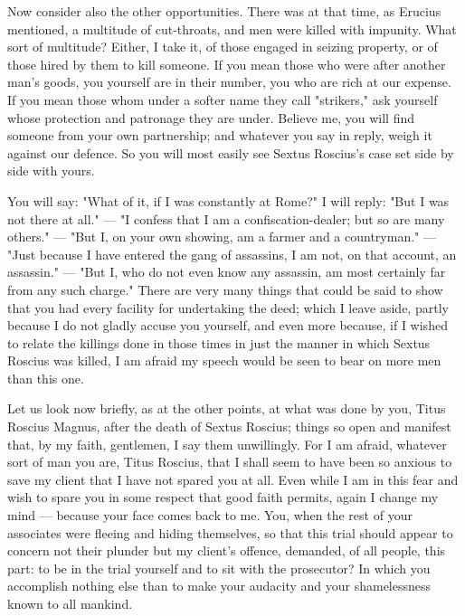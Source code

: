  Now consider also the other opportunities. There was at that time, as Erucius mentioned, a multitude of cut-throats, and men were killed with impunity. What sort of multitude? Either, I take it, of those engaged in seizing property, or of those hired by them to kill someone. If you mean those who were after another man's goods, you yourself are in their number, you who are rich at our expense. If you mean those whom under a softer name they call "strikers," ask yourself whose protection and patronage they are under. Believe me, you will find someone from your own partnership; and whatever you say in reply, weigh it against our defence. So you will most easily see Sextus Roscius's case set side by side with yours.

 You will say: "What of it, if I was constantly at Rome?" I will reply: "But I was not there at all." --- "I confess that I am a confiscation-dealer; but so are many others." --- "But I, on your own showing, am a farmer and a countryman." --- "Just because I have entered the gang of assassins, I am not, on that account, an assassin." --- "But I, who do not even know any assassin, am most certainly far from any such charge." There are very many things that could be said to show that you had every facility for undertaking the deed; which I leave aside, partly because I do not gladly accuse you yourself, and even more because, if I wished to relate the killings done in those times in just the manner in which Sextus Roscius was killed, I am afraid my speech would be seen to bear on more men than this one.

 Let us look now briefly, as at the other points, at what was done by you, Titus Roscius Magnus, after the death of Sextus Roscius; things so open and manifest that, by my faith, gentlemen, I say them unwillingly. For I am afraid, whatever sort of man you are, Titus Roscius, that I shall seem to have been so anxious to save my client that I have not spared you at all. Even while I am in this fear and wish to spare you in some respect that good faith permits, again I change my mind --- because your face comes back to me. You, when the rest of your associates were fleeing and hiding themselves, so that this trial should appear to concern not their plunder but my client's offence, demanded, of all people, this part: to be in the trial yourself and to sit with the prosecutor? In which you accomplish nothing else than to make your audacity and your shamelessness known to all mankind.

